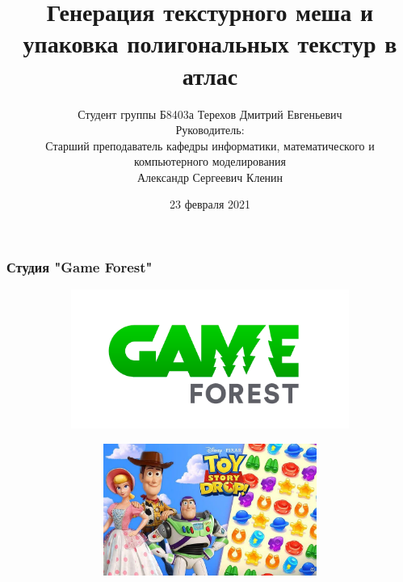 \documentclass[10pt, unicode]{beamer}
\title{Генерация текстурного меша и упаковка полигональных текстур в атлас}
\author[Терехов Д.Е.]{Студент группы Б8403а Терехов Дмитрий Евгеньевич\\
Руководитель:\\
Старший преподаватель кафедры информатики, математического и компьютерного моделирования\\
Александр Сергеевич Кленин}
\date{23 февраля 2021}
\begin{document}
    \begin{frame}[fragile]
        \titlepage
        \thispagestyle{empty}
    \end{frame}
    \begin{frame}
        \frametitle{Студия "Game Forest"}
        \begin{figure}[H]
            \centering
            \begin{subfigure}[l]{0.50\linewidth}
                \centering
                \includegraphics[scale=0.15]{GAMEFOREST.png}
            \end{subfigure}
            \begin{subfigure}{0.49\linewidth}
                \begin{subfigure}{\linewidth}
                    \centering
                    \includegraphics[scale=0.15]{TSD.jpg}
                \end{subfigure}
                \begin{subfigure}{\linewidth}
                    \centering

\end{subfigure}
\end{subfigure}
\end{figure}
\end{frame}
\end{document}
